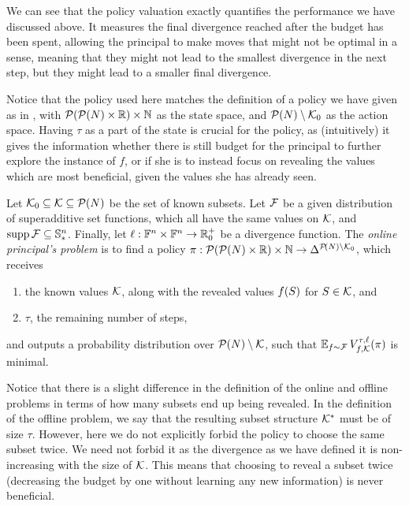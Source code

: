 We can see that the policy valuation exactly quantifies the performance we have discussed above.
It measures the final divergence reached after the budget has been spent, allowing the principal to make moves that might not be optimal in a  sense, meaning that they might not lead to the smallest divergence in the next step, but they might lead to a smaller final divergence.

Notice that the policy used here matches the definition of a policy we have given as  in , with $ \mathcal{P}\!\left(\mathcal{P}\!\left(N\right) \times \mathbb{R}\right) \times \mathbb{N} $ as the state space, and $ \mathcal{P}\!\left(N\right) \setminus \mathcal{K}_0 $ as the action space.
Having $ \tau $ as a part of the state is crucial for the policy, as (intuitively) it gives the information whether there is still budget for the principal to further explore the instance of $ f $, or if she is to instead focus on revealing the values which are most beneficial, given the values she has already seen.

\begin{defi} \label{def:online-pp}
  Let $ \mathcal{K}_0 \subseteq \mathcal{K} \subseteq \mathcal{P}\!\left(N\right) $ be the set of known subsets.
  Let $ \mathcal{F} $ be a given distribution of superadditive set functions, which all have the same values on $ \mathcal{K} $, and $ \operatorname{supp} \mathcal{F} \subseteq \mathbb{S}^n_* $.
  Finally, let $ \ell: \mathbb{F}^n \times \mathbb{F}^n \to \mathbb{R}^+_0 $ be a divergence function.
  The \emph{online principal's problem} is to find a policy $ \pi: \mathcal{P}\!\left(\mathcal{P}\!\left(N\right) \times \mathbb{R}\right) \times \mathbb{N} \to \Delta^{\mathcal{P}\!\left(N\right) \setminus \mathcal{K}_0} $,
  which receives \begin{enumerate}[ ]
    \item the known values $ \mathcal{K} $, along with the revealed values $ f\!\left(S\right) $ for $ S \in \mathcal{K} $, and
    \item $ \tau $, the remaining number of steps,
  \end{enumerate}
  and outputs a probability distribution over $ \mathcal{P}\!\left(N\right) \setminus \mathcal{K} $, such that $ \operatorname*{\mathbb{E}}_{f \sim \mathcal{F}} V^{\tau,\ell}_{f,\mathcal{K}}\!\left(\pi\right) $ is minimal.
\end{defi}

Notice that there is a slight difference in the definition of the online and offline problems in terms of how many subsets end up being revealed.
In the definition of the offline problem, we say that the resulting subset structure $ \mathcal{K}^* $ must be of size $ \tau $.
However, here we do not explicitly forbid the policy to choose the same subset twice.
We need not forbid it as the divergence as we have defined it is non-increasing with the size of $ \mathcal{K} $.
This means that choosing to reveal a subset twice (decreasing the budget by one without learning any new information) is never beneficial.

